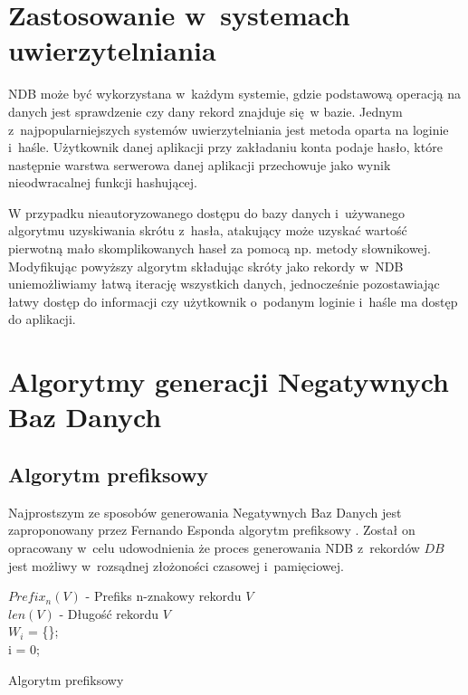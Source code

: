\section{Zastosowanie w~systemach uwierzytelniania}
NDB może być wykorzystana w~każdym systemie, gdzie podstawową operacją na danych jest sprawdzenie czy
dany rekord znajduje się w bazie. Jednym z~najpopularniejszych systemów uwierzytelniania jest metoda oparta na loginie i~haśle.
Użytkownik danej aplikacji przy zakładaniu konta podaje hasło, które następnie warstwa serwerowa danej aplikacji przechowuje jako wynik nieodwracalnej funkcji hashującej.

W przypadku nieautoryzowanego dostępu do bazy danych i~używanego algorytmu uzyskiwania skrótu z~hasła, atakujący może uzyskać 
wartość pierwotną mało skomplikowanych haseł za pomocą np. metody słownikowej. Modyfikując powyższy algorytm 
składując skróty jako rekordy w~NDB uniemożliwiamy łatwą iterację wszystkich danych, jednocześnie pozostawiając
łatwy dostęp do informacji czy użytkownik o~podanym loginie i~haśle ma dostęp do aplikacji.

\section{Algorytmy generacji Negatywnych Baz Danych}
\subsection{Algorytm prefiksowy}
\label{sec:prefix-alg}
Najprostszym ze sposobów generowania Negatywnych Baz Danych jest zaproponowany przez Fernando Esponda 
algorytm prefiksowy \cite{NRI-Esponda, Esponda2004EnhancingPT}. Został on opracowany w~celu udowodnienia
że proces generowania NDB z~rekordów $DB$ jest możliwy w~rozsądnej złożoności czasowej i~pamięciowej.

\begin{algorithm}[!htb]
    \SetAlgoLined
    $Prefix_n(V)$ - Prefiks n-znakowy rekordu $V$\\
    $len(V)$ - Długość rekordu $V$\\
    $W_i$ = \{\};\\
    i = 0;\\
    
    \caption{Algorytm prefiksowy}
    \label{alg:prefix}
\end{algorithm}

